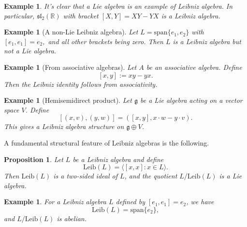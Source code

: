 \documentclass[12pt]{amsart}
\newcommand{\Leib}{\mathrm{Leib}}
\theoremstyle{plain}
\newtheorem{proposition}[theorem]{Proposition}
\newtheorem{example}[theorem]{Example}
\theoremstyle{definition}
\begin{document}
\begin{example}
  It's clear that a Lie algebra is an example of Leibniz algebra.  In particular, $\mathfrak{sl}_2(\mathbb{R})$ with bracket $[X,Y]=XY-YX$ is a Leibniz algebra.  
\end{example}

\begin{example}[A non-Lie Leibniz algebra]
Let $L = \mathrm{span}\{e_1,e_2\}$ with
$[e_1,e_1] = e_2,$ and all other brackets being zero.
Then $L$ is a Leibniz algebra but not a Lie algebra.
\end{example}

\begin{example}[From associative algebras]
Let $A$ be an associative algebra. Define
\[
[x,y] := xy-yx.
\]
Then the Leibniz identity follows from associativity.
\end{example}

\begin{example}[Hemisemidirect product]
Let $\mathfrak{g}$ be a Lie algebra acting on a vector space $V$. Define
\[
[(x,v),(y,w)] = ([x,y], x \cdot w - y \cdot v).
\]
This gives a Leibniz algebra structure on $\mathfrak{g} \oplus V$.
\end{example}




A fundamental structural feature of Leibniz algebras is the following.

\begin{proposition}
Let $L$ be a Leibniz algebra and define
\[
\Leib(L) = \langle [x,x] : x \in L \rangle.
\]
Then $\Leib(L)$ is a two-sided ideal of $L$, and the quotient $L/\Leib(L)$ is a Lie algebra.
\end{proposition}

\begin{example}
For a Leibniz algebra $L$ defined by $[e_1,e_1]=e_2$, we have
\[
\Leib(L) = \mathrm{span}\{e_2\},
\]
and $L/\Leib(L)$ is abelian.
\end{example}


\end{document}

